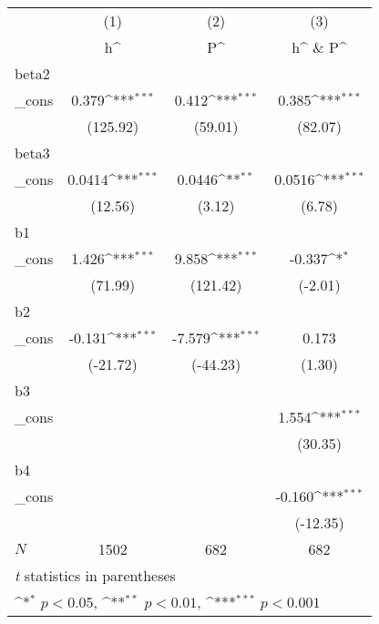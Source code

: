{
\def\sym#1{\ifmmode^{#1}\else\(^{#1}\)\fi}
\begin{tabular}{l*{3}{c}}
\hline\hline
            &\multicolumn{1}{c}{(1)}&\multicolumn{1}{c}{(2)}&\multicolumn{1}{c}{(3)}\\
            &\multicolumn{1}{c}{h^}&\multicolumn{1}{c}{P^}&\multicolumn{1}{c}{h^ \& P^}\\
\hline
beta2       &                     &                     &                     \\
\_cons      &       0.379\sym{***}&       0.412\sym{***}&       0.385\sym{***}\\
            &    (125.92)         &     (59.01)         &     (82.07)         \\
\hline
beta3       &                     &                     &                     \\
\_cons      &      0.0414\sym{***}&      0.0446\sym{**} &      0.0516\sym{***}\\
            &     (12.56)         &      (3.12)         &      (6.78)         \\
\hline
b1          &                     &                     &                     \\
\_cons      &       1.426\sym{***}&       9.858\sym{***}&      -0.337\sym{*}  \\
            &     (71.99)         &    (121.42)         &     (-2.01)         \\
\hline
b2          &                     &                     &                     \\
\_cons      &      -0.131\sym{***}&      -7.579\sym{***}&       0.173         \\
            &    (-21.72)         &    (-44.23)         &      (1.30)         \\
\hline
b3          &                     &                     &                     \\
\_cons      &                     &                     &       1.554\sym{***}\\
            &                     &                     &     (30.35)         \\
\hline
b4          &                     &                     &                     \\
\_cons      &                     &                     &      -0.160\sym{***}\\
            &                     &                     &    (-12.35)         \\
\hline
\(N\)       &        1502         &         682         &         682         \\
\hline\hline
\multicolumn{4}{l}{\footnotesize \textit{t} statistics in parentheses}\\
\multicolumn{4}{l}{\footnotesize \sym{*} \(p<0.05\), \sym{**} \(p<0.01\), \sym{***} \(p<0.001\)}\\
\end{tabular}
}
